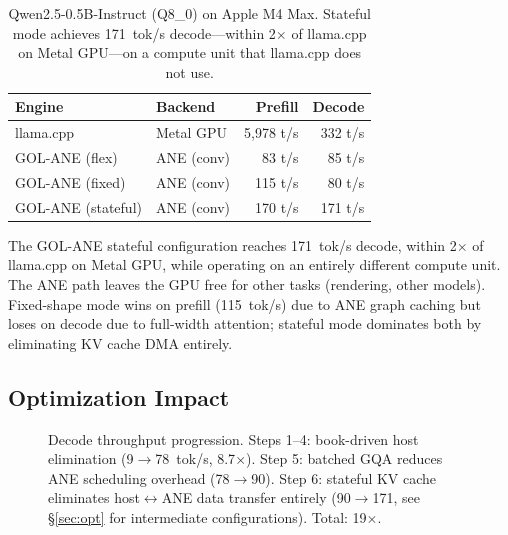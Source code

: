 \documentclass[11pt,twocolumn]{article}
\begin{document}
\begin{table}[t]
\centering
\footnotesize
\begin{tabular}{llrr}
\toprule
\textbf{Engine} & \textbf{Backend} & \textbf{Prefill} & \textbf{Decode} \\
\midrule
llama.cpp & Metal GPU & 5,978 t/s & 332 t/s \\
GOL-ANE (flex) & ANE (conv) & 83 t/s & 85 t/s \\
GOL-ANE (fixed) & ANE (conv) & 115 t/s & 80 t/s \\
GOL-ANE (stateful) & ANE (conv) & 170 t/s & 171 t/s \\
\bottomrule
\end{tabular}
\caption{Qwen2.5-0.5B-Instruct (Q8\_0) on Apple M4 Max. Stateful mode
achieves 171~tok/s decode---within 2$\times$ of llama.cpp on Metal
GPU---on a compute unit that llama.cpp does not use.}
\label{tab:transformer}
\end{table}

The GOL-ANE stateful configuration reaches 171~tok/s decode, within
2$\times$ of llama.cpp on Metal GPU, while operating on an entirely
different compute unit. The ANE path leaves the GPU free for other
tasks (rendering, other models). Fixed-shape mode wins on prefill
(115~tok/s) due to ANE graph caching but loses on decode due to
full-width attention; stateful mode dominates both by eliminating KV
cache DMA entirely.

\subsection{Optimization Impact}

\begin{figure}[t]
\centering
{}
\caption{Decode throughput progression.  Steps 1--4: book-driven host
elimination (9$\to$78~tok/s, 8.7$\times$).  Step 5: batched GQA
reduces ANE scheduling overhead (78$\to$90).  Step 6: stateful KV
cache eliminates host$\leftrightarrow$ANE data transfer entirely
(90$\to$171, see \S\ref{sec:opt} for intermediate configurations).
Total: 19$\times$.}
\label{fig:optbar}
\end{figure}
\end{document}
